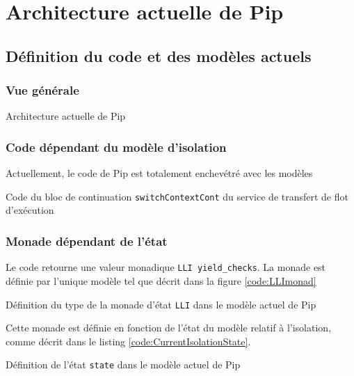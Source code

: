 	\section{Architecture actuelle de Pip}

		\subsection{Définition du code et des modèles actuels}

			\subsubsection{Vue générale}

			\begin{listing}[!ht]
				
				\caption{Architecture actuelle de Pip}
				\label{fig:switchContextCont}
			\end{listing}

			\subsubsection{Code dépendant du modèle d'isolation}

			Actuellement, le code de Pip est totalement enchevétré avec les modèles

			\begin{listing}[!ht]
				\caption{Code du bloc de continuation \texttt{switchContextCont} du service de transfert de flot d'exécution}
				\label{code:switchContextCont}
			\end{listing}

			\subsubsection{Monade dépendant de l'état}

		Le code retourne une valeur monadique \texttt{LLI yield\_checks}. La monade est définie par l'unique modèle tel que décrit dans la figure \ref{code:LLImonad}
		\begin{listing}[!ht]
			\caption{Définition du type de la monade d'état \texttt{LLI} dans le modèle actuel de Pip}
			\label{code:LLImonad}
		\end{listing}

		Cette monade est définie en fonction de l'état du modèle relatif à l'isolation, comme décrit dans le listing \ref{code:CurrentIsolationState}.
		\begin{listing}[!ht]
			\caption{Définition de l'état \texttt{state} dans le modèle actuel de Pip}
			\label{code:CurrentIsolationState}
		\end{listing}
		
